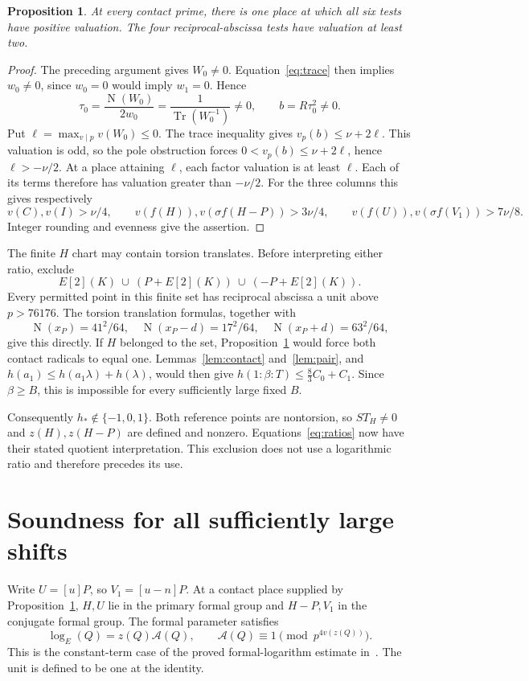 \documentclass[11pt,a4paper]{article}
\newtheorem{proposition}[theorem]{Proposition}
\DeclareMathOperator{\Tr}{Tr}\DeclareMathOperator{\Nm}{N}
\begin{document}
\begin{proposition}\label{prop:local}
At every contact prime, there is one place at which all six tests have
positive valuation. The four reciprocal-abscissa tests have valuation
at least two.
\end{proposition}
\begin{proof}
The preceding argument gives $W_0\ne0$. Equation~\eqref{eq:trace} then
implies $w_0\ne0$, since $w_0=0$ would imply $w_1=0$. Hence
\[
 \tau_0=\frac{\Nm(W_0)}{2w_0}=\frac1{\Tr(W_0^{-1})}\ne0,
 \qquad b=R\tau_0^2\ne0.
\]
Put $\ell=\max_{v\mid p}v(W_0)\le0$. The trace inequality gives
$v_p(b)\le\nu+2\ell$. This valuation is odd, so the pole obstruction
forces $0<v_p(b)\le\nu+2\ell$, hence $\ell>-\nu/2$.
At a place attaining $\ell$, each factor valuation is at least $\ell$.
Each of its terms therefore has valuation greater than $-\nu/2$.
For the three columns this gives respectively
\[
 v(C),v(I)>\nu/4,\qquad
 v(f(H)),v(\sigma f(H-P))>3\nu/4,\qquad
 v(f(U)),v(\sigma f(V_1))>7\nu/8.
\]
Integer rounding and evenness give the assertion.
\end{proof}

The finite $H$ chart may contain torsion translates. Before interpreting
either ratio, exclude
\[
                  E[2](K)\ \cup\ (P+E[2](K))\ \cup\ (-P+E[2](K)).
\]
Every permitted point in this finite set has reciprocal abscissa a unit
above $p>76176$. The torsion translation formulas, together with
\[
 \Nm(x_P)=41^2/64,\quad
 \Nm(x_P-d)=17^2/64,\quad \Nm(x_P+d)=63^2/64,
\]
give this directly. If $H$ belonged to the set, Proposition~\ref{prop:local}
would force both contact radicals to equal one. Lemmas~\ref{lem:contact}
and~\ref{lem:pair}, and $h(a_1)\le h(a_1\lambda)+h(\lambda)$, would
then give $h(1:\beta:T)\le\frac83C_0+C_1$. Since $\beta\ge B$, this is
impossible for every sufficiently large fixed $B$.

Consequently $h_*\notin\{-1,0,1\}$. Both reference points are
nontorsion, so $S T_H\ne0$ and $z(H),z(H-P)$ are defined and nonzero.
Equations~\eqref{eq:ratios} now have their stated quotient interpretation.
This exclusion does not use a logarithmic ratio and therefore precedes
its use.

\section{Soundness for all sufficiently large shifts}

Write $U=[u]P$, so $V_1=[u-n]P$. At a contact place supplied by
Proposition~\ref{prop:local}, $H,U$ lie in the primary formal group
and $H-P,V_1$ in the conjugate formal group. The formal parameter satisfies
\begin{equation}\label{eq:log}
 \log_E(Q)=z(Q)\mathcal A(Q),\qquad
 \mathcal A(Q)\equiv1\pmod{p^{4v(z(Q))}}.
\end{equation}
This is the constant-term case of the proved formal-logarithm estimate
in~\cite{Logs}. The unit is defined to be one at the identity.
\end{document}
